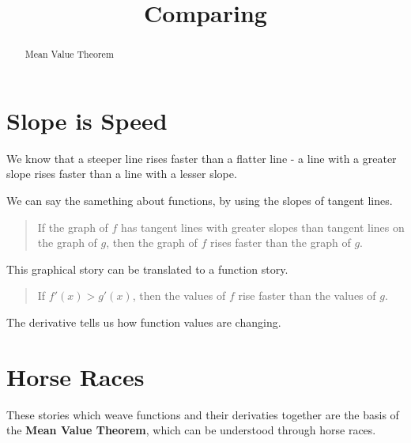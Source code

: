 \documentclass{ximera}
\title{Comparing}
\begin{document}
\begin{abstract}
Mean Value Theorem
\end{abstract}
\maketitle






\section{Slope is Speed}



We know that a steeper line rises faster than a flatter line - a line with a greater slope rises faster than a line with a lesser slope. 


We can say the samething about functions, by using the slopes of tangent lines.


\begin{quote}

If the graph of $f$ has tangent lines with greater slopes than tangent lines on the graph of $g$, then the graph of $f$ rises faster than the graph of $g$.

\end{quote}


This graphical story can be translated to a function story.  


\begin{quote}

If $f'(x) > g'(x)$, then the values of $f$ rise faster than the values of $g$.

\end{quote}





The derivative tells us how function values are changing. \\





\section{Horse Races}



These stories which weave functions and their derivaties together are the basis of the \textbf{Mean Value Theorem}, which can be understood through horse races. \\
\end{document}
